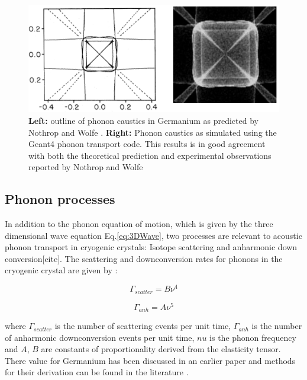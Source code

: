 \documentclass[preprint,12pt]{elsarticle}
\begin{document}
\begin{figure}
	\centering
		\includegraphics[width=1.00\textwidth]{caustics.png}
	\caption{\textbf{Left:} outline of phonon caustics in Germanium as predicted by Nothrop and Wolfe \cite{Nothrop}. \textbf{Right:} Phonon caustics as simulated using the Geant4 phonon transport code. This results is in good agreement with both the theoretical prediction and experimental observations reported by Nothrop and Wolfe \cite{Nothrop} }
	\label{fig:caustics}
\end{figure}

\subsection{Phonon processes}
\label{sec:Processes}

In addition to the phonon equation of motion, which is given by the three dimensional wave equation Eq.\ref{eq:3DWave}, two processes are relevant to acoustic phonon transport in cryogenic crystals: Isotope scattering and anharmonic down conversion[cite]. The scattering and downconversion rates for phonons in the cryogenic crystal are given by \cite{Tamura2}:

\begin{equation}
\label{eq:ScatterRate}
\Gamma_{scatter} = B\nu^4
\end{equation}

\begin{equation}
\label{eq:anhRate}
\Gamma_{anh} = A\nu^5
\end{equation}

where $\Gamma_{scatter}$ is the number of scattering events per unit time, $\Gamma_{anh}$ is the number of anharmonic downconversion events per unit time, $nu$ is the phonon frequency and $A$, $B$ are constants of proportionality derived from the elasticity tensor. There value for Germanium has been discussed in an earlier paper \cite{Brandt} and methods for their derivation can be found in the literature \cite{Tamura1} \cite{Tamura2}.
\end{document}

